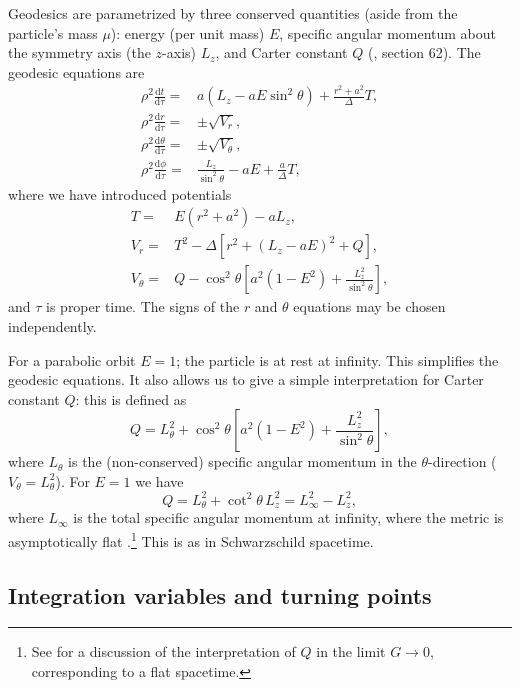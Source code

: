 \documentclass[useAMS,usedcolumn,usegraphicx,usenatbib]{mn2e}
\newcommand{\dd}{\ensuremath{\mathrm{d}}}
\newcommand{\diff}[2]{\ensuremath{\frac{\dd {#1}}{\dd {#2}}}}
\begin{document}
Geodesics are parametrized by three conserved quantities (aside from the particle's mass $\mu$): energy (per unit mass) $E$, specific angular momentum about the symmetry axis (the $z$-axis) $L_z$, and Carter constant $Q$ (\citealt{Carter1968, Chandrasekhar1998}, section 62). The geodesic equations are
\begin{align}
\rho^2 \diff{t}{\tau} = {} & a\left(L_z - aE\sin^2 \theta\right) + \frac{r^2 + a^2}{\Delta}T,\\
\rho^2 \diff{r}{\tau} = {} & \pm \sqrt{V_r},\\
\rho^2 \diff{\theta}{\tau} = {} & \pm \sqrt{V_\theta},\\
\rho^2 \diff{\phi}{\tau} = {} & \frac{L_z}{\sin^2 \theta} - aE + \frac{a}{\Delta}T,
\end{align}
where we have introduced potentials
\begin{align}
T = {} & E\left(r^2 +a^2\right) - aL_z,\\
V_r = {} & T^2 - \Delta\left[r^2 + \left(L_z -aE\right)^2 + Q\right],\\
V_\theta = {} & Q - \cos^2 \theta\left[a^2\left(1 - E^2\right) + \frac{L_z^2}{\sin^2\theta}\right],
\end{align}
and $\tau$ is proper time. The signs of the $r$ and $\theta$ equations may be chosen independently.

For a parabolic orbit $E = 1$; the particle is at rest at infinity. This simplifies the geodesic equations. It also allows us to give a simple interpretation for Carter constant $Q$: this is defined as
\begin{equation}
Q = L_\theta^2 + \cos^2\theta\left[a^2\left(1 - E^2\right) + \frac{L_z^2}{\sin^2\theta}\right],
\end{equation}
where $L_\theta$ is the (non-conserved) specific angular momentum in the $\theta$-direction ($ V_\theta = L_\theta^2$). For $E = 1$ we have
\begin{equation}
Q = L_\theta^2 + \cot^2\theta\, L_z^2 = L_\infty^2 - L_z^2,
\end{equation}
where $L_\infty$ is the total specific angular momentum at infinity, where the metric is asymptotically flat \citep{DeFelice1980}.\footnote{See \citet*{Rosquist2009} for a discussion of the interpretation of $Q$ in the limit $G \rightarrow 0$, corresponding to a flat spacetime.} This is as in Schwarzschild spacetime.

\subsection{Integration variables and turning points}
\end{document}
